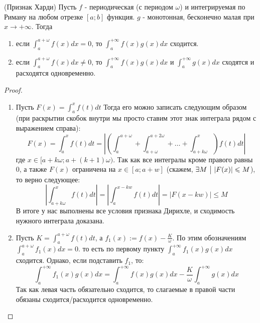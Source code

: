 \begin{theorem} (Признак Харди)
	Пусть $f$ - периодическая (с периодом $\omega$) и интегрируемая по Риману на любом отрезке $[a;b]$ функция. $g$ - монотонная, бесконечно малая при $x\to +\infty$. Тогда
	\begin{enumerate}
		\item если $\int_a^{a + \omega}f(x)dx = 0$, то $\int_a^{+\infty}f(x)g(x)dx$ сходится.
		\item если $\int_a^{a + \omega}f(x)dx \neq 0$, то $\int_a^{+\infty}f(x)g(x)dx$ и $\int_a^{+\infty}g(x)dx$ сходятся и расходятся одновременно.
	\end{enumerate}
\end{theorem}

\begin{proof}~
	\begin{enumerate}
		\item Пусть $F(x) = \int_a^x f(t)dt$ Тогда его можно записать следующим образом (при раскрытии скобок внутри мы просто ставим этот знак интеграла рядом с выражением справа): 
		\[
			F(x) = \int_a^x f(t)dt = \left|\left(\int_a^{a + \omega} + \int_{a + \omega}^{a + 2\omega} + \ldots + \int_{a + k\omega}^x\right) f(t)dt \right|
		\]
		где  $x \in [a + k\omega;a + (k + 1)\omega)$. 
		Так как все интегралы кроме правого равны 0, а также $F(x)$ ограничена на $x \in [a; a + w]$ (скажем, $\exists M \ \big|\  |F(x)| \leqslant M$), то верно следующее:
		\[
			\left|\int_{a + k\omega}^x f(t)dt\right| = \left|\int_a^{x - kw} f(t)dt \right| = |F(x - kw)| \le M
		\]
		В итоге у нас выполнены все условия признака Дирихле, и сходимость нужного интеграла доказана.
		
		\item Пусть $K = \int_a^{a + \omega} f(t)dt$, а $f_1(x) := f(x) - \frac{K}{\omega}$. По этим обозначениям $\int_a^{a + \omega}f_1(x)dx = 0$. то есть по первому пункту $\int_a^{+\infty}f_1(x)g(x)dx$ сходится. Однако, если подставить $f_1$, то:
		\[
			\int_a^{+\infty}f_1(x)g(x)dx = \int_a^{+\infty}f(x)g(x)dx - \frac{K}{\omega}\int_a^{+\infty}g(x)dx
		\]
		Так как левая часть обязательно сходится, то слагаемые в правой части обязаны сходится/расходится одновременно.
	\end{enumerate}
\end{proof}

